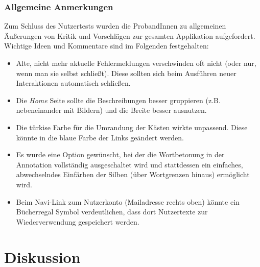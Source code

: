 \subsubsection{Allgemeine Anmerkungen}

Zum Schluss des Nutzertests wurden die ProbandInnen zu allgemeinen Äußerungen von Kritik und Vorschlägen zur gesamten Applikation aufgefordert. Wichtige Ideen und Kommentare sind im Folgenden festgehalten:

\begin{itemize}
	\item Alte, nicht mehr aktuelle Fehlermeldungen verschwinden oft nicht (oder nur, wenn man sie selbst schließt). Diese sollten sich beim Ausführen neuer Interaktionen automatisch schließen.
	\item Die \textit{Home} Seite sollte die Beschreibungen besser gruppieren (z.B. nebeneinander mit Bildern) und die Breite besser ausnutzen.
	\item Die türkise Farbe für die Umrandung der Kästen wirkte unpassend. Diese könnte in die blaue Farbe der Links geändert werden.
	\item Es wurde eine Option gewünscht, bei der die Wortbetonung in der Annotation vollständig ausgeschaltet wird und stattdessen ein einfaches, abwechselndes Einfärben der Silben (über Wortgrenzen hinaus) ermöglicht wird.
	\item Beim Navi-Link zum Nutzerkonto (Mailadresse rechts oben) könnte ein Bücherregal Symbol verdeutlichen, dass dort Nutzertexte zur Wiederverwendung gespeichert werden.
\end{itemize}

\newpage
\section{Diskussion}

